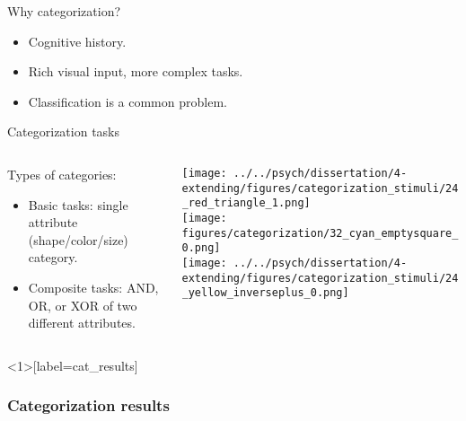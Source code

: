 \documentclass{beamer}
\begin{document}
\begin{frame}{Why categorization?}
\begin{itemize}
\item Cognitive history.
\item Rich visual input, more complex tasks.
\item Classification is a common problem.
\end{itemize}
\end{frame}
\begin{frame}{Categorization tasks}
\begin{columns}
\begin{column}{0.5\textwidth}
Types of categories:
\begin{itemize}
\item Basic tasks: single attribute (shape/color/size) category.
\item Composite tasks: AND, OR, or XOR of two different attributes.  
\end{itemize}
\end{column}
\begin{column}{0.5\textwidth}
\centering
\texttt{[image: ../../psych/dissertation/4-extending/figures/categorization\_stimuli/24\_red\_triangle\_1.png]}\\
\texttt{[image: figures/categorization/32\_cyan\_emptysquare\_0.png]}\\
\texttt{[image: ../../psych/dissertation/4-extending/figures/categorization\_stimuli/24\_yellow\_inverseplus\_0.png]}
\end{column}
\end{columns}
\end{frame}


\begin{frame}<1>[label=cat_results]
\frametitle{Categorization results}
\end{frame}

\end{document}
